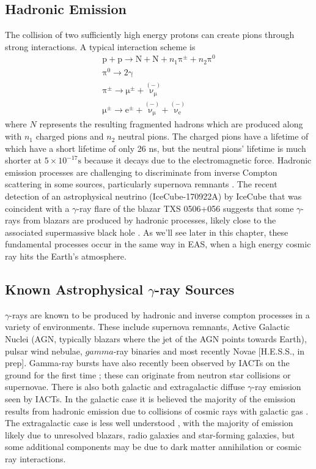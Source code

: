 \subsection{Hadronic Emission}
The collision of two sufficiently high energy protons can create pions through strong interactions.  A typical interaction scheme \cite{EAS} is
\begin{gather*}
\mathrm{p}+\mathrm{p}\rightarrow \mathrm{N}+\mathrm{N}+n_1 \mathrm{\pi^{\pm}}+n_2\mathrm{\pi^0} \\
\mathrm{\pi^0} \rightarrow \mathrm{2\gamma} \\
\mathrm{\mathrm{\pi^{\pm}}} \rightarrow \mathrm{\mu^{\pm}}+\mathrm{\overset{(-)}{\nu_{\mu}}}\\
\mathrm{\mu^{\pm}} \rightarrow \mathrm{e^{\pm}}+\mathrm{\overset{(-)}{\nu_{\mu}}}+\mathrm{\overset{(-)}{\nu_{e}}}
\end{gather*}
where $N$ represents the resulting fragmented hadrons which are produced along with $n_1$ charged pions and $n_2$ neutral pions. The charged pions have a lifetime of which have a short lifetime of only 26 ns, but the neutral pions' lifetime is much shorter at $5 \times 10^{-17} \mathrm{s}$ because it decays due to the electromagnetic force. Hadronic emission processes are challenging to discriminate from inverse Compton scattering in some sources, particularly supernova remnants \cite{rxjcta}. The recent detection of an astrophysical neutrino (IceCube-170922A) by IceCube that was coincident with a $\gamma$-ray flare of the blazar TXS 0506+056 suggests that some $\gamma$-rays from blazars are produced by hadronic processes, likely close to the associated supermassive black hole \cite{TXS}. As we'll see later in this chapter, these fundamental processes occur in the same way in EAS, when a high energy cosmic ray hits the Earth's atmosphere.

\subsection{Known Astrophysical $\gamma$-ray Sources}
$\gamma$-rays are known to be produced by hadronic and inverse compton processes in a variety of environments. These include supernova remnants, Active Galactic Nuclei (AGN, typically blazars where the jet of the AGN points towards Earth), pulsar wind nebulae, $gamma$-ray binaries \cite{scienceCTA} and most recently Novae [H.E.S.S., in prep]. Gamma-ray bursts have also recently been observed by IACTs on the ground for the first time \cite{magicGRB}; these can originate from neutron star collisions or supernovae. There is also both galactic and extragalactic diffuse $\gamma$-ray emission seen by IACTs. In the galactic case it is believed the majority of the emission results from hadronic emission due to collisions of cosmic rays with galactic gas \cite{extragamma}. The extragalactic case is less well understood \cite{extragamma}, with the majority of emission likely due to unresolved blazars, radio galaxies and star-forming galaxies, but some additional components may be due to dark matter annihilation or cosmic ray interactions.

